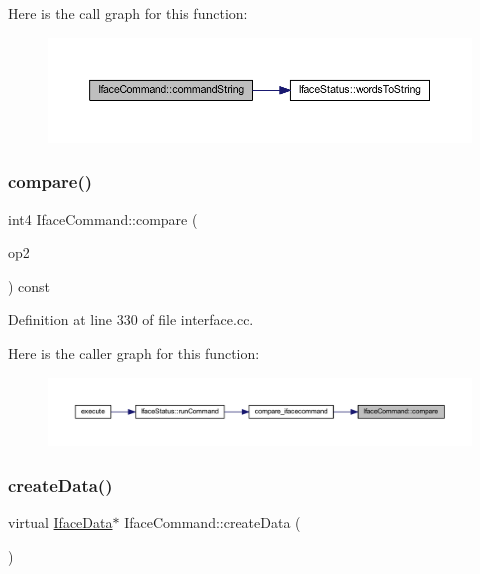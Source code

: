 Here is the call graph for this function\+:
\nopagebreak
\begin{figure}[H]
\begin{center}
\leavevmode
\includegraphics[width=350pt]{class_iface_command_a4ee3f097c09e0ede38ce8e37a64cb458_cgraph}
\end{center}
\end{figure}
\mbox{\label{class_iface_command_a7517eda70ce8d1ca6ed564e475b02f9f}} 
\subsubsection{\texorpdfstring{compare()}{compare()}}
{\footnotesize\ttfamily int4 Iface\+Command\+::compare (\begin{DoxyParamCaption}\item[{const \mbox{\hyperlink{class_iface_command}{Iface\+Command}} \&}]{op2 }\end{DoxyParamCaption}) const}



Definition at line 330 of file interface.\+cc.

Here is the caller graph for this function\+:
\nopagebreak
\begin{figure}[H]
\begin{center}
\leavevmode
\includegraphics[width=350pt]{class_iface_command_a7517eda70ce8d1ca6ed564e475b02f9f_icgraph}
\end{center}
\end{figure}
\mbox{\label{class_iface_command_a908e484baf6e090b46ceb2ccaea8139d}} 
\subsubsection{\texorpdfstring{createData()}{createData()}}
{\footnotesize\ttfamily virtual \mbox{\hyperlink{class_iface_data}{Iface\+Data}}$\ast$ Iface\+Command\+::create\+Data (\begin{DoxyParamCaption}\item[{void}]{ }\end{DoxyParamCaption})\hspace{0.3cm}{\ttfamily [pure virtual]}}



